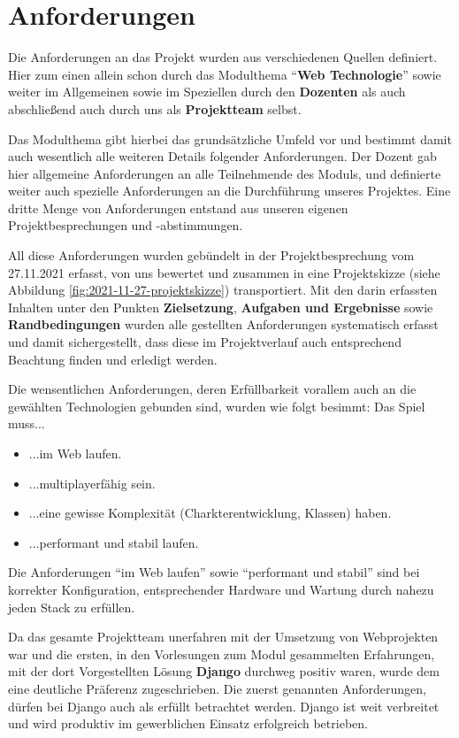
\section{Anforderungen} \label{anforderungen}

Die Anforderungen an das Projekt wurden aus verschiedenen Quellen definiert. Hier zum einen allein schon durch das Modulthema \enquote{\textbf{Web Technologie}} sowie weiter im Allgemeinen sowie im Speziellen durch den \textbf{Dozenten} als auch abschließend auch durch uns als \textbf{Projektteam} selbst. 

Das Modulthema gibt hierbei das grundsätzliche Umfeld vor und bestimmt damit auch wesentlich alle weiteren Details folgender Anforderungen. Der Dozent gab hier allgemeine Anforderungen an alle Teilnehmende des Moduls, und definierte weiter auch spezielle Anforderungen an die Durchführung unseres Projektes. Eine dritte Menge von Anforderungen entstand aus unseren eigenen Projektbesprechungen und -abstimmungen.  

All diese Anforderungen wurden gebündelt in der Projektbesprechung vom 27.11.2021 erfasst, von uns bewertet und zusammen in eine Projektskizze (siehe Abbildung  \ref{fig:2021-11-27-projektskizze}) transportiert. Mit den darin erfassten Inhalten unter den Punkten \textbf{Zielsetzung}, \textbf{Aufgaben und Ergebnisse} sowie \textbf{Randbedingungen} wurden alle gestellten Anforderungen systematisch erfasst und damit sichergestellt, dass diese im Projektverlauf auch entsprechend Beachtung finden und erledigt werden. 


Die wensentlichen Anforderungen, deren Erfüllbarkeit vorallem auch an die gewählten Technologien gebunden sind, wurden wie folgt besimmt: Das Spiel muss... \begin{itemize}
    \item ...im Web laufen.
    \item ...multiplayerfähig sein.
    \item ...eine gewisse Komplexität (Charkterentwicklung, Klassen) haben.
    \item ...performant und stabil laufen.
\end{itemize}


Die Anforderungen \enquote{im Web laufen} sowie \enquote{performant und stabil} sind bei korrekter Konfiguration, entsprechender Hardware und Wartung durch nahezu jeden \ac{Stack} zu erfüllen. 

Da das gesamte Projektteam unerfahren mit der Umsetzung von Webprojekten war und die ersten, in den Vorlesungen zum Modul gesammelten Erfahrungen, mit der dort Vorgestellten Lösung \textbf{Django} durchweg positiv waren, wurde dem eine deutliche Präferenz zugeschrieben. Die zuerst genannten Anforderungen, dürfen bei Django auch als erfüllt betrachtet werden. Django ist weit verbreitet und wird produktiv im gewerblichen Einsatz erfolgreich betrieben. 

